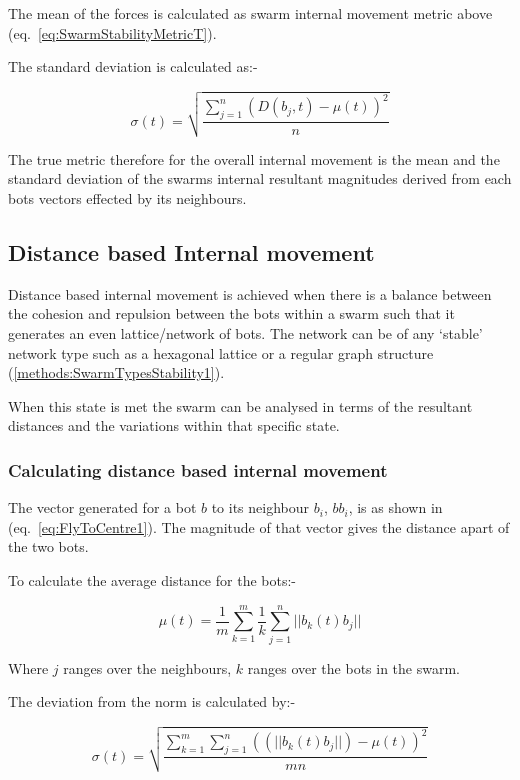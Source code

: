 \documentclass[10pt,journal,letterpaper,twoside]{IEEEtran}
\newcommand{\stability}{internal movement}
\newcommand{\Stability}{Internal movement}
\newcommand{\Eq}{eq.}
\begin{document}
The mean of the forces is calculated as swarm \stability{} metric
above (\Eq{}~\ref{eq:SwarmStabilityMetricT}).

The standard deviation is calculated as:-

\begin{equation}
\label{eq:SwarmStabilityQuotientT}
\sigma(t) = \sqrt{\frac{\sum_{j=1}^{n}(D(b_j,t)-\mu(t))^2}{n}}
\end{equation}

The true metric therefore for the overall \stability{} is the mean and
the standard deviation of the swarms internal resultant magnitudes
derived from each bots vectors effected by its neighbours.

\subsection{Distance based \Stability{}}

Distance based \stability{} is achieved when there is a balance
between the cohesion and repulsion between the bots within a swarm
such that it generates an even lattice/network of bots. The network
can be of any `stable' network type such as a hexagonal lattice or a
regular graph structure (\ref{methods:SwarmTypesStability1}).

When this state is met the swarm can be analysed in terms of the
resultant distances and the variations within that specific state.

\subsubsection{Calculating distance based \stability{}}

The vector generated for a bot $b$ to its neighbour $b_i$, $bb_i$, is
as shown in (\Eq{}~\ref{eq:FlyToCentre1}). The magnitude of that
vector gives the distance apart of the two bots.

To calculate the average distance for the bots:-

\begin{equation}
\label{eq:SwarmStabilityDistance1}
\mu(t) = \frac{1}{m}{\sum_{k=1}^{m}}\frac{1}{k}{\sum_{j=1}^{n}||b_k(t)b_j||}
\end{equation}

Where $j$ ranges over the neighbours, $k$ ranges over the bots in the
swarm.

The deviation from the norm is calculated by:-

\begin{equation}
\label{eq:SwarmStabilityQuotientT}
\sigma(t) = \sqrt{\frac{\sum_{k=1}^{m}\sum_{j=1}^{n}((||b_k(t)b_j||)-\mu(t))^2}{mn}}
\end{equation}
\end{document}
